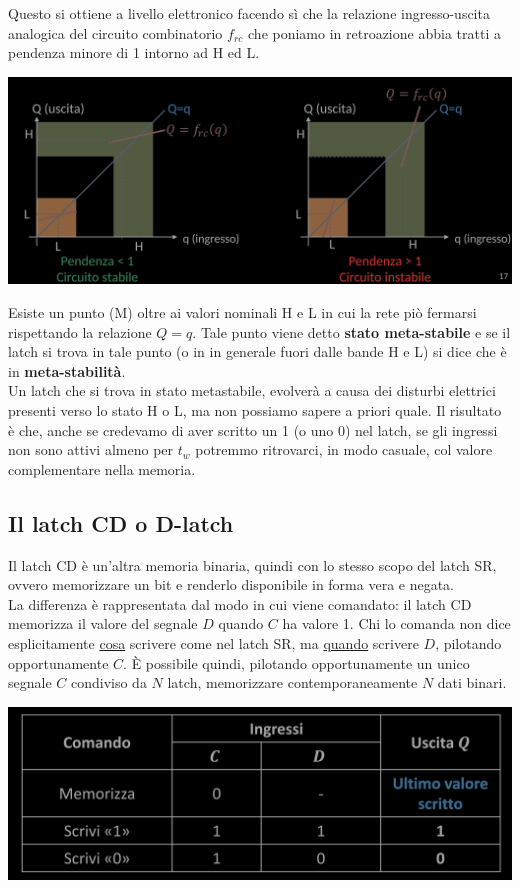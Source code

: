 \documentclass{article}
\begin{document}
Questo si ottiene a livello elettronico facendo sì che la relazione ingresso-uscita analogica del circuito combinatorio $f_{rc}$ che poniamo in retroazione abbia tratti a pendenza minore di 1 intorno ad H ed L.
\begin{center}
    \includegraphics[scale=0.35]{metastabilita2.png}
\end{center}
Esiste un punto (M) oltre ai valori nominali H e L in cui la rete piò fermarsi rispettando la relazione $Q=q$. Tale punto viene detto \textbf{\color{cyan} stato meta-stabile} e se il latch si trova in tale punto (o in in generale fuori dalle bande H e L) si dice che è in \textbf{\color{cyan} meta-stabilità}.\\
Un latch che si trova in stato metastabile, evolverà a causa dei disturbi elettrici presenti verso lo stato H o L, ma non possiamo sapere a priori quale. Il risultato è che, anche se credevamo di aver scritto un 1 (o uno 0) nel latch, se gli ingressi non sono attivi almeno per $t_w$ potremmo ritrovarci, in modo casuale, col valore complementare nella memoria.


\subsection{Il latch CD o D-latch}
Il latch CD è un’altra memoria binaria, quindi con lo stesso scopo del latch SR, ovvero memorizzare un bit e renderlo disponibile in forma vera e negata.\\
La differenza è rappresentata dal modo in cui viene comandato: il latch CD memorizza il valore del segnale $D$ quando $C$ ha valore 1. Chi lo comanda non dice esplicitamente \underline{cosa} scrivere come nel latch SR, ma \underline{quando} scrivere $D$, pilotando opportunamente $C$. È possibile quindi, pilotando opportunamente un unico segnale $C$ condiviso da $N$ latch, memorizzare contemporaneamente $N$ dati binari.
\begin{center}
    \includegraphics[scale=0.35]{latchCD-tab.png}
\end{center}
\end{document}
